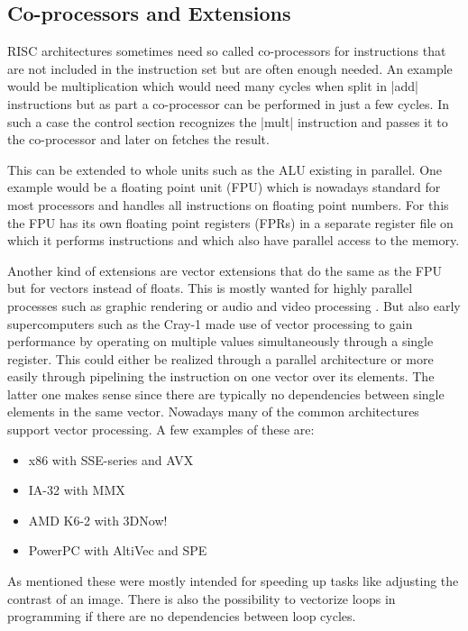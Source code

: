 \subsection{Co-processors and Extensions}

RISC architectures sometimes need so called co-processors for instructions that are not included in the instruction set but are often enough needed.
An example would be multiplication which would need many cycles when split in |add| instructions but as part a co-processor can be performed in just a few cycles.
In such a case the control section recognizes the |mult| instruction and passes it to the co-processor and later on fetches the result.

This can be extended to whole units such as the ALU existing in parallel.
One example would be a floating point unit (FPU) which is nowadays standard for most processors and handles all instructions on floating point numbers.
For this the FPU has its own floating point registers (FPRs) in a separate register file on which it performs instructions and which also have parallel access to the memory.

Another kind of extensions are vector extensions that do the same as the FPU but for vectors instead of floats.
This is mostly wanted for highly parallel processes such as graphic rendering or audio and video processing .
But also early supercomputers such as the Cray-1  made use of vector processing to gain performance by operating on multiple values  simultaneously through a single register.
This could either be realized through a parallel architecture or more easily through pipelining the instruction on one vector over its elements.
The latter one makes sense since there are typically no dependencies between single elements in the same vector.
Nowadays many of the common architectures support vector processing.
A few examples of these are:
\begin{itemize}
    \item x86 with SSE-series and AVX
    \item IA-32 with MMX
    \item AMD K6-2 with 3DNow!
    \item PowerPC with AltiVec and SPE
\end{itemize}
As mentioned these were mostly intended for speeding up tasks like adjusting the contrast of an image.
There is also the possibility to vectorize loops in programming if there are no dependencies between loop cycles.
    

